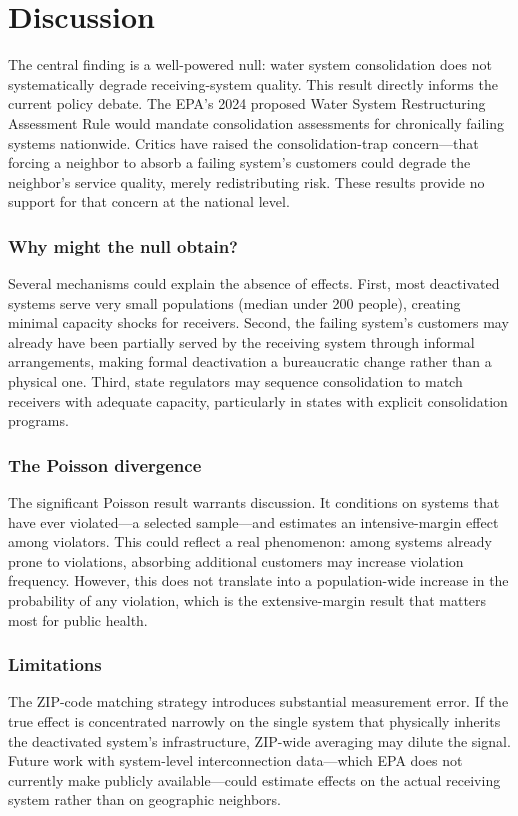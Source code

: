 \documentclass[12pt]{article}
\begin{document}
\section{Discussion}

The central finding is a well-powered null: water system consolidation does not systematically degrade receiving-system quality. This result directly informs the current policy debate. The EPA's 2024 proposed Water System Restructuring Assessment Rule \citep{epa2024restructuring} would mandate consolidation assessments for chronically failing systems nationwide. Critics have raised the consolidation-trap concern---that forcing a neighbor to absorb a failing system's customers could degrade the neighbor's service quality, merely redistributing risk. These results provide no support for that concern at the national level.

\subsubsection*{Why might the null obtain?} Several mechanisms could explain the absence of effects. First, most deactivated systems serve very small populations (median under 200 people), creating minimal capacity shocks for receivers. Second, the failing system's customers may already have been partially served by the receiving system through informal arrangements, making formal deactivation a bureaucratic change rather than a physical one. Third, state regulators may sequence consolidation to match receivers with adequate capacity, particularly in states with explicit consolidation programs.

\subsubsection*{The Poisson divergence} The significant Poisson result warrants discussion. It conditions on systems that have ever violated---a selected sample---and estimates an intensive-margin effect among violators. This could reflect a real phenomenon: among systems already prone to violations, absorbing additional customers may increase violation frequency. However, this does not translate into a population-wide increase in the probability of any violation, which is the extensive-margin result that matters most for public health.

\subsubsection*{Limitations} The ZIP-code matching strategy introduces substantial measurement error. If the true effect is concentrated narrowly on the single system that physically inherits the deactivated system's infrastructure, ZIP-wide averaging may dilute the signal. Future work with system-level interconnection data---which EPA does not currently make publicly available---could estimate effects on the actual receiving system rather than on geographic neighbors.
\end{document}
